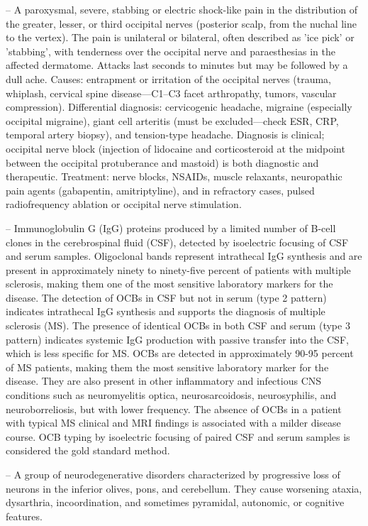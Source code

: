 -- A paroxysmal, severe, stabbing or electric shock-like pain in the distribution of the greater, lesser, or third occipital nerves (posterior scalp, from the nuchal line to the vertex). The pain is unilateral or bilateral, often described as 'ice pick' or 'stabbing', with tenderness over the occipital nerve and paraesthesias in the affected dermatome. Attacks last seconds to minutes but may be followed by a dull ache. Causes: entrapment or irritation of the occipital nerves (trauma, whiplash, cervical spine disease—C1--C3 facet arthropathy, tumors, vascular compression). Differential diagnosis: cervicogenic headache, migraine (especially occipital migraine), giant cell arteritis (must be excluded—check ESR, CRP, temporal artery biopsy), and tension-type headache. Diagnosis is clinical; occipital nerve block (injection of lidocaine and corticosteroid at the midpoint between the occipital protuberance and mastoid) is both diagnostic and therapeutic. Treatment: nerve blocks, NSAIDs, muscle relaxants, neuropathic pain agents (gabapentin, amitriptyline), and in refractory cases, pulsed radiofrequency ablation or occipital nerve stimulation.

-- Immunoglobulin G (IgG) proteins produced by a limited number of B-cell clones in the cerebrospinal fluid (CSF), detected by isoelectric focusing of CSF and serum samples. Oligoclonal bands represent intrathecal IgG synthesis and are present in approximately ninety to ninety-five percent of patients with multiple sclerosis, making them one of the most sensitive laboratory markers for the disease. The detection of OCBs in CSF but not in serum (type 2 pattern) indicates intrathecal IgG synthesis and supports the diagnosis of multiple sclerosis (MS). The presence of identical OCBs in both CSF and serum (type 3 pattern) indicates systemic IgG production with passive transfer into the CSF, which is less specific for MS. OCBs are detected in approximately 90-95 percent of MS patients, making them the most sensitive laboratory marker for the disease. They are also present in other inflammatory and infectious CNS conditions such as neuromyelitis optica, neurosarcoidosis, neurosyphilis, and neuroborreliosis, but with lower frequency. The absence of OCBs in a patient with typical MS clinical and MRI findings is associated with a milder disease course. OCB typing by isoelectric focusing of paired CSF and serum samples is considered the gold standard method.

-- A group of neurodegenerative disorders characterized by progressive loss of neurons in the inferior olives, pons, and cerebellum. They cause worsening ataxia, dysarthria, incoordination, and sometimes pyramidal, autonomic, or cognitive features.

